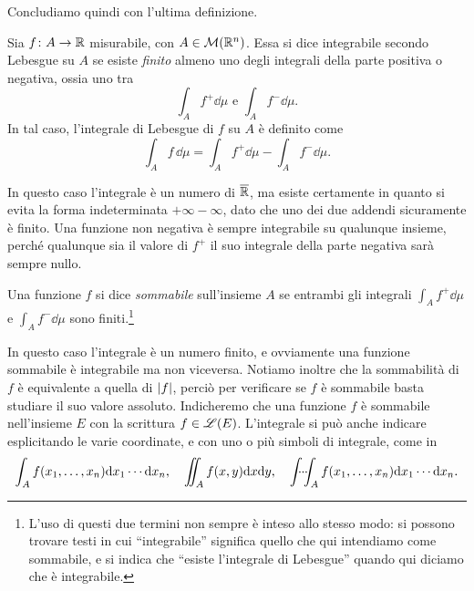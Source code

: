 Concludiamo quindi con l'ultima definizione.
\begin{definizione} \label{d:integrale-lebesgue-funzioni-qualunque}
	Sia $f\colon A\to\mathbb{R}$ misurabile, con $A\in\mathcal M(\mathbb{R}^n)$.
	Essa si dice integrabile secondo Lebesgue su $A$ se esiste \emph{finito} almeno uno degli integrali della parte positiva o negativa, ossia uno tra
	\begin{equation*}
		\int_Af^+\dd\mu\text{ e }\int_Af^-\dd\mu.
	\end{equation*}
	In tal caso, l'integrale di Lebesgue di $f$ su $A$ è definito come
	\begin{equation}
		\int_Af\,\dd\mu=\int_Af^+\dd\mu-\int_Af^-\dd\mu.
		\label{eq:integrale-lebesgue-funzioni-qualunque}
	\end{equation}
\end{definizione}
In questo caso l'integrale è un numero di $\overline{\mathbb{R}}$, ma esiste certamente in quanto si evita la forma indeterminata $+\infty-\infty$, dato che uno dei due addendi sicuramente è finito.
Una funzione non negativa è sempre integrabile su qualunque insieme, perch\'e qualunque sia il valore di $f^+$ il suo integrale della parte negativa sarà sempre nullo.
\begin{definizione} \label{d:funzione-sommabile}
	Una funzione $f$ si dice \emph{sommabile} sull'insieme $A$ se entrambi gli integrali $\int_Af^+\dd\mu$ e $\int_Af^-\dd\mu$ sono finiti.\footnote{L'uso di questi due termini non sempre è inteso allo stesso modo: si possono trovare testi in cui ``integrabile'' significa quello che qui intendiamo come sommabile, e si indica che ``esiste l'integrale di Lebesgue'' quando qui diciamo che è integrabile.}
\end{definizione}
In questo caso l'integrale è un numero finito, e ovviamente una funzione sommabile è integrabile ma non viceversa.
Notiamo inoltre che la sommabilità di $f$ è equivalente a quella di $\lvert f\rvert$, perciò per verificare se $f$ è sommabile basta studiare il suo valore assoluto.
Indicheremo che una funzione $f$ è sommabile nell'insieme $E$ con la scrittura $f\in\mathscr L(E)$.
L'integrale si può anche indicare esplicitando le varie coordinate, e con uno o più simboli di integrale, come in
\begin{equation*}
	\int_Af(x_1,\dots,x_n)\textup{d} x_1\cdots\textup{d} x_n,\quad \iint_Af(x,y)\textup{d} x\textup{d} y,\quad \idotsint_Af(x_1,\dots,x_n)\textup{d} x_1\cdots\textup{d} x_n.
\end{equation*}

